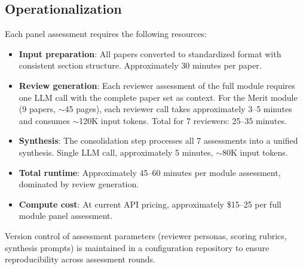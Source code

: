 \subsection{Operationalization}

Each panel assessment requires the following resources:
\begin{itemize}
    \item \textbf{Input preparation}: All papers converted to standardized format with consistent section structure. Approximately 30 minutes per paper.
    \item \textbf{Review generation}: Each reviewer assessment of the full module requires one LLM call with the complete paper set as context. For the Merit module (9 papers, $\sim$45 pages), each reviewer call takes approximately 3--5 minutes and consumes $\sim$120K input tokens. Total for 7 reviewers: 25--35 minutes.
    \item \textbf{Synthesis}: The consolidation step processes all 7 assessments into a unified synthesis. Single LLM call, approximately 5 minutes, $\sim$80K input tokens.
    \item \textbf{Total runtime}: Approximately 45--60 minutes per module assessment, dominated by review generation.
    \item \textbf{Compute cost}: At current API pricing, approximately \$15--25 per full module panel assessment.
\end{itemize}

Version control of assessment parameters (reviewer personas, scoring rubrics, synthesis prompts) is maintained in a configuration repository to ensure reproducibility across assessment rounds.

